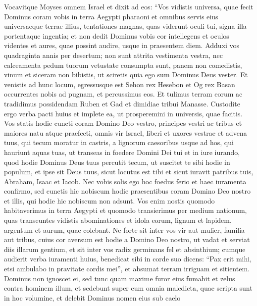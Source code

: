 \begin{biblechapter} 
\verse Vocavitque Moyses omnem Israel et dixit ad eos: “Vos vidistis universa, quae fecit Dominus coram vobis in terra Aegypti pharaoni et omnibus servis eius universaeque terrae illius, 
\verse tentationes magnas, quas viderunt oculi tui, signa illa portentaque ingentia; 
\verse et non dedit Dominus vobis cor intellegens et oculos videntes et aures, quae possint audire, usque in praesentem diem. 
\verse Adduxi vos quadraginta annis per desertum; non sunt attrita vestimenta vestra, nec calceamenta pedum tuorum vetustate consumpta sunt, 
\verse panem non comedistis, vinum et siceram non bibistis, ut sciretis quia ego sum Dominus Deus vester.  
\verse Et venistis ad hunc locum, egressusque est Sehon rex Hesebon et Og rex Basan occurrentes nobis ad pugnam, et percussimus eos. 
\verse Et tulimus terram eorum ac tradidimus possidendam Ruben et Gad et dimidiae tribui Manasse. 
\verse Custodite ergo verba pacti huius et implete ea, ut prosperemini in universis, quae facitis. 
\verse Vos statis hodie cuncti coram Domino Deo vestro, principes vestri ac tribus et maiores natu atque praefecti, omnis vir Israel, 
\verse liberi et uxores vestrae et advena tuus, qui tecum moratur in castris, a lignorum caesoribus usque ad hos, qui hauriunt aquas tuas, 
\verse ut transeas in foedere Domini Dei tui et in iure iurando, quod hodie Dominus Deus tuus percutit tecum, 
\verse ut suscitet te sibi hodie in populum, et ipse sit Deus tuus, sicut locutus est tibi et sicut iuravit patribus tuis, Abraham, Isaac et Iacob. 
\verse Nec vobis solis ego hoc foedus ferio et haec iuramenta confirmo, 
\verse sed cunctis hic nobiscum hodie praesentibus coram Domino Deo nostro et illis, qui hodie hic nobiscum non adsunt. 
\verse Vos enim nostis quomodo habitaverimus in terra Aegypti et quomodo transierimus per medium nationum, quas transeuntes  
\verse vidistis abominationes et idola eorum, lignum et lapidem, argentum et aurum, quae colebant. 
\verse Ne forte sit inter vos vir aut mulier, familia aut tribus, cuius cor aversum est hodie a Domino Deo nostro, ut vadat et serviat diis illarum gentium, et sit inter vos radix germinans fel et absinthium; 
\verse cumque audierit verba iuramenti huius, benedicat sibi in corde suo dicens: “Pax erit mihi, etsi ambulabo in pravitate cordis mei”, et absumat terram irriguam et sitientem. 
\verse Dominus non ignoscet ei, sed tunc quam maxime furor eius fumabit et zelus contra hominem illum, et sedebunt super eum omnia maledicta, quae scripta sunt in hoc volumine, et delebit Dominus nomen eius sub caelo  

\end{biblechapter}
